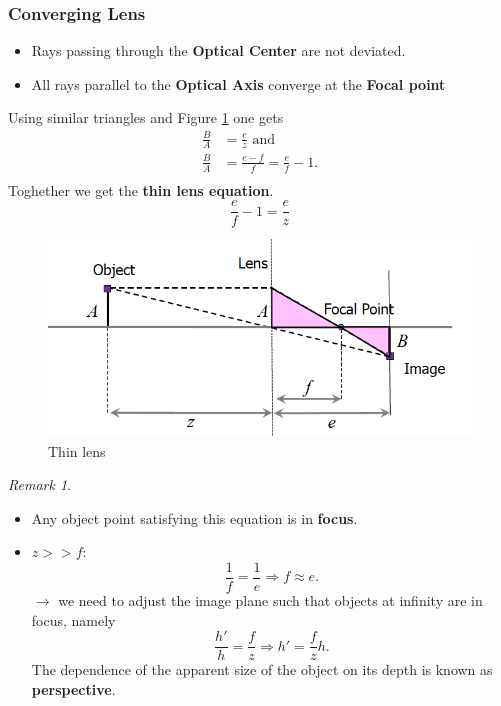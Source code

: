 \documentclass[a4paper,12 pt]{article}
\theoremstyle{definition}
\theoremstyle{remark}
\newtheorem*{bmk}{Remark}
\theoremstyle{definition}
\theoremstyle{definition}
\theoremstyle{definition}
\theoremstyle{remark}
\theoremstyle{definition}
\begin{document}
\subsubsection*{Converging Lens}
\begin{itemize}
\item Rays passing through the \textbf{Optical Center} are not deviated.
\item All rays parallel to the \textbf{Optical Axis} converge at the \textbf{Focal point}
\end{itemize}
Using similar triangles and Figure \ref{fig:focal} one gets
\begin{equation}
\begin{split}
\frac{B}{A}&=\frac{e}{z} \text{ and}\\
\frac{B}{A}&=\frac{e-f}{f}=\frac{e}{f}-1.\\
\end{split}
\end{equation}
Toghether we get the \textbf{thin lens equation}.
\begin{equation}
\frac{e}{f}-1=\frac{e}{z}
\end{equation}
\begin{figure}[h!]
\begin{center}
\includegraphics[scale=0.5]{pics/focal}
\caption{Thin lens \label{fig:focal}}
\end{center}
\end{figure}
\begin{bmk}
\
\begin{itemize}
\item Any object point satisfying this equation is in \textbf{focus}.
\item $z>>f$: 
\begin{equation}
\frac{1}{f}=\frac{1}{e} \Rightarrow f \approx e.
\end{equation}
$\rightarrow$ we need to adjust the image plane such that objects at infinity are in focus, namely
\begin{equation}
\frac{h'}{h}=\frac{f}{z} \Rightarrow h'=\frac{f}{z}h.
\end{equation}
The dependence of the apparent size of the object on its depth is known as \textbf{perspective}.

\end{itemize}
\end{bmk}
\end{document}
